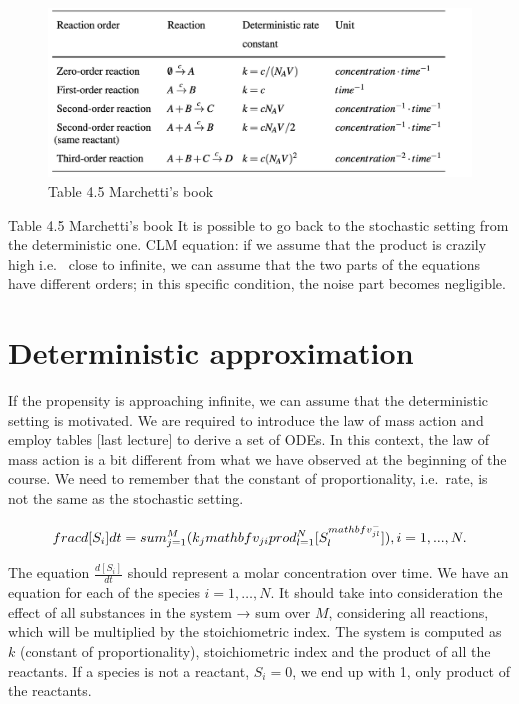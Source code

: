 \begin{figure}
  \centering
  \includegraphics[width=\textwidth]{reaction_rates.png}
  \caption{Table 4.5 Marchetti's book}
\end{figure}

Table 4.5 Marchetti's book It is possible to go back to the stochastic setting from the deterministic one.
CLM equation: if we assume that the product is crazily high i.e. ~close to infinite, we can assume that the two parts of the equations have different orders; in this specific condition, the noise part becomes negligible.

\section{Deterministic approximation}
If the propensity is approaching infinite, we can assume that the deterministic setting is motivated.
We are required to introduce the law of mass action and employ tables {[}last lecture{]} to derive a set of ODEs.
In this context, the law of mass action is a bit different from what we have observed at the beginning of the course.
We need to remember that the constant of proportionality, i.e.~rate, is not the same as the stochastic setting.

$$ frac{d[S_i]}{dt}= \\sum^M_{j=1}( k_j\\mathbf{v}_{ji}\\prod^{N}_{l=1}{[S_l^{\\mathbf{v}^{-}_{jl}}]}) ,i = 1,...,N.$$

The equation $\frac{d[S_i]}{dt}$ should represent a molar concentration over time.
We have an equation for each of the species $i=1,…,N$.
It should take into consideration the effect of all substances in the system → sum over $M$, considering all reactions, which will be multiplied by the stoichiometric index.
The system is computed as $k$ (constant of proportionality), stoichiometric index and the product of all the reactants.
If a species is not a reactant, $S_i=0$, we end up with 1, only product of the reactants.

